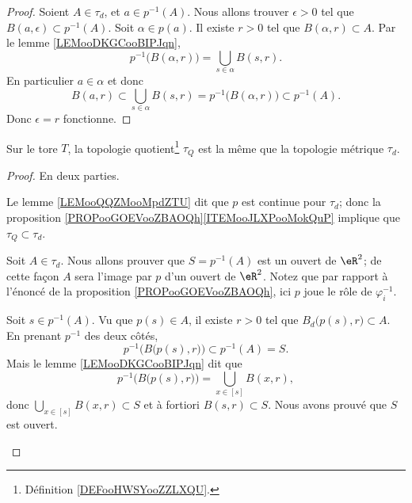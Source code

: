 \begin{proof}
	Soient \( A\in \tau_d\), et \( a\in p^{-1}(A)\). Nous allons trouver \( \epsilon>0\) tel que \( B(a,\epsilon)\subset p^{-1}(A)\). Soit \( \alpha\in p(a)\). Il existe \( r>0\) tel que \( B(\alpha,r)\subset A\). Par le lemme \ref{LEMooDKGCooBIPJqn},
	\begin{equation}
		p^{-1}\big( B(\alpha,r) \big)=\bigcup_{s\in \alpha}B(s,r).
	\end{equation}
	En particulier \( a\in\alpha\) et donc
	\begin{equation}
		B(a,r)\subset\bigcup_{s\in \alpha}B(s,r)=p^{-1}\big( B(\alpha,r) \big)\subset p^{-1}(A).
	\end{equation}
	Donc \( \epsilon=r\) fonctionne.
\end{proof}

\begin{proposition}	\label{PROPooFUQHooKZMoMm}
	Sur le tore \( T\), la topologie quotient\footnote{Définition \ref{DEFooHWSYooZZLXQU}.} \( \tau_Q\) est la même que la topologie métrique \( \tau_d\).
\end{proposition}

\begin{proof}
	En deux parties.
	\begin{subproof}
		Le lemme \ref{LEMooQQZMooMpdZTU} dit que \( p\) est continue pour \( \tau_d\); donc la proposition \ref{PROPooGOEVooZBAOQh}\ref{ITEMooJLXPooMokQuP} implique que \( \tau_Q\subset\tau_d\).

		Soit \( A\in \tau_d\). Nous allons prouver que \( S=p^{-1}(A)\) est un ouvert de \( \eR^2\); de cette façon \( A\) sera l'image par \( p\) d'un ouvert de \( \eR^2\). Notez que par rapport à l'énoncé de la proposition \ref{PROPooGOEVooZBAOQh}, ici \( p\) joue le rôle de \( \varphi_i^{-1}\).

		Soit \( s\in p^{-1}(A)\). Vu que \( p(s)\in A\), il existe \( r>0\) tel que \( B_d\big( p(s),r \big)\subset A\). En prenant \( p^{-1}\) des deux côtés,
		\begin{equation}
			p^{-1}\Big(  B\big( p(s),r \big) \Big)\subset p^{-1}(A)=S.
		\end{equation}
		Mais le lemme \ref{LEMooDKGCooBIPJqn} dit que
		\begin{equation}
			p^{-1}\Big( B\big( p(s),r \big) \Big)=\bigcup_{x\in [s]}B(x,r),
		\end{equation}
		donc \( \bigcup_{x\in [s]}B(x,r)\subset S\) et à fortiori \( B(s,r)\subset S\). Nous avons prouvé que \( S\) est ouvert.
	\end{subproof}
\end{proof}


